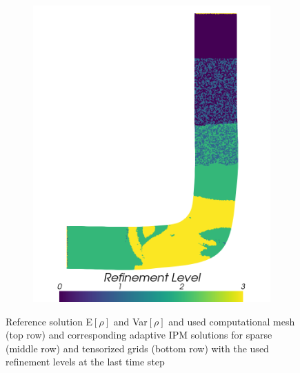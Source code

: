 \begin{figure}[H]
\begin{subfigure}{0.3\linewidth}
		\includegraphics[scale=0.18]{figs/pipe/euler2D_pipe_n1-4_tg1-3_refinementLevel.png}
		\caption{}
		\label{fig:adIPMSolutionsPipeTGRI}
	\end{subfigure}
	\caption{Reference solution E$[\rho]$ and Var$[\rho]$ and used computational mesh (top row) and corresponding adaptive IPM solutions for sparse (middle row) and tensorized grids (bottom row) with the used refinement levels at the last time step}
	\label{fig:solution3D}
\end{figure}
